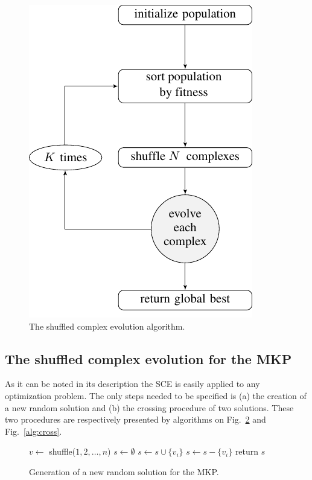 \begin{figure}
  \includegraphics{imgs/flow1}
  \caption{The shuffled complex evolution algorithm.}
  \label{fig:flow1}
\end{figure}


\subsection{The shuffled complex evolution for the MKP}
\label{subsec:scemkp}

As it can be noted in its description the SCE is easily applied to any
optimization problem.
The only steps needed to be specified is (a) the creation of a new random
solution and (b) the crossing procedure of two solutions.
These two procedures are respectively presented by algorithms on
Fig.~\ref{alg:new} and Fig.~\ref{alg:cross}.

\begin{figure}
\begin{algorithmic}[1]
    \State $v \leftarrow $ shuffle($1, 2, \ldots, n$)
	\State $s \leftarrow \emptyset$ 
	  \State $s \leftarrow s \cup \{v_i\}$ 
	   
	    \State $s \leftarrow s - \{v_i\}$
      \EndIf
	\EndFor
  \State return $s$
  \EndProcedure
\end{algorithmic}
\caption{Generation of a new random solution for the MKP.}
\label{alg:new}
\end{figure}

